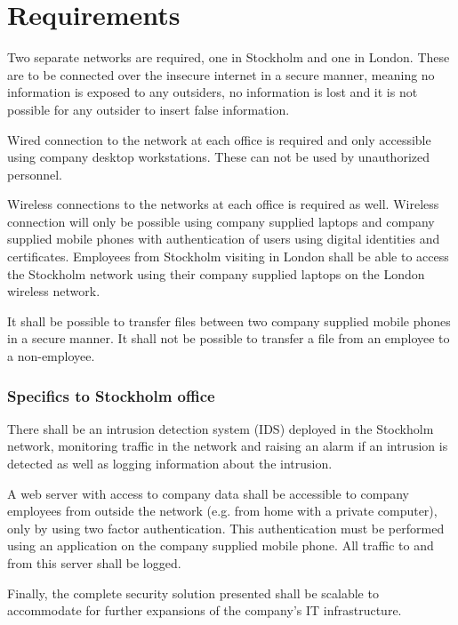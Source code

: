 \section*{Requirements}

Two separate networks are required, one in Stockholm and one in London. These are to be connected over the insecure internet in a secure manner, meaning no information is exposed to any outsiders, no information is lost and it is not possible for any outsider to insert false information.

Wired connection to the network at each office is required and only accessible using company desktop workstations. These can not be used by unauthorized personnel.

Wireless connections to the networks at each office is required as well. Wireless connection will only be possible using company supplied laptops and company supplied mobile phones with authentication of users using digital identities and certificates. Employees from Stockholm visiting in London shall be able to access the Stockholm network using their company supplied laptops on the London wireless network.

It shall be possible to transfer files between two company supplied mobile phones in a secure manner. It shall not be possible to transfer a file from an employee to a non-employee.

\subsubsection*{Specifics to Stockholm office}

There shall be an intrusion detection system (IDS) deployed in the Stockholm network, monitoring traffic in the network and raising an alarm if an intrusion is detected as well as logging information about the intrusion.

A web server with access to company data shall be accessible to company employees from outside the network (e.g. from home with a private computer), only by using two factor authentication. This authentication must be performed using an application on the company supplied mobile phone. All traffic to and from this server shall be logged.

Finally, the complete security solution presented shall be scalable to accommodate for further expansions of the company's IT infrastructure.


